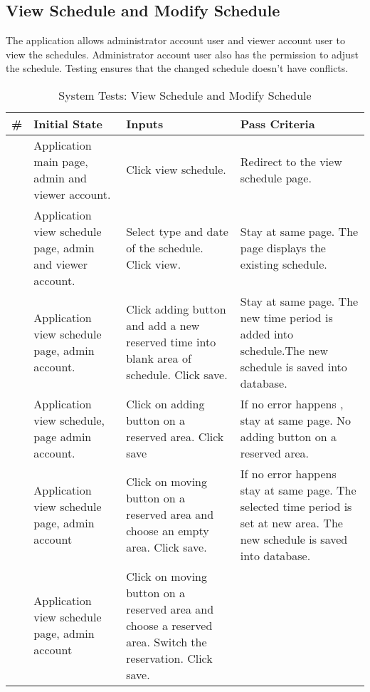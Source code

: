 \documentclass[12pt]{article}
\newcounter{TestCounter}
\begin{document}
\subsection{View Schedule and Modify Schedule}
The application allows administrator account user and viewer account user to view the schedules. Administrator account user also has the permission to adjust the schedule. Testing ensures that the changed schedule doesn’t have conflicts. 
\begin{center}
	\begin{longtable}{c>{\raggedright\arraybackslash}p{4.8cm} >{\raggedright\arraybackslash}p{3cm}>{\raggedright\arraybackslash}p{3cm}}
		\caption{System Tests: View Schedule and Modify Schedule}\label{ViewSchedule_SystemTests}\\
		\toprule
		\bf \# & \bf Initial State & \bf Inputs & \bf Pass Criteria  \\\midrule
		\stepcounter{TestCounter}\arabic{TestCounter} 
		& Application main page, admin and viewer account.
		& Click view schedule. 
		& Redirect to the view schedule page.
		\\\midrule
		\stepcounter{TestCounter}\arabic{TestCounter} 
		& Application view schedule page, admin and viewer account.
		& Select type and date of the schedule. Click view.
		& Stay at same page. The page displays the existing schedule.
		\\\midrule
		\stepcounter{TestCounter}\arabic{TestCounter} 
		& Application view schedule page, admin account.
		& Click adding button and add a new reserved time into blank area of schedule. Click save.
		& Stay at same page. The new time period is added into schedule.The new schedule is saved into database.
		\\\midrule
		\stepcounter{TestCounter}\arabic{TestCounter} 
		& Application view schedule, page admin account.
		& Click on adding button on a reserved area. Click save 
		& If no error happens , stay at same page. No adding button on a reserved area.
		\\\midrule
		\stepcounter{TestCounter}\arabic{TestCounter} 
		& Application view schedule page, admin account 
		& Click on moving button on a reserved area and choose an empty area. Click save.
		& If no error happens stay at same page. The selected time period is set at new area. The new schedule is saved into database.
		\\\midrule
		\stepcounter{TestCounter}\arabic{TestCounter} 
		& Application view schedule page, admin account 
		& Click on moving button on a reserved area and choose a reserved area. Switch the reservation. Click save.

\end{longtable}
\end{center}
\end{document}
